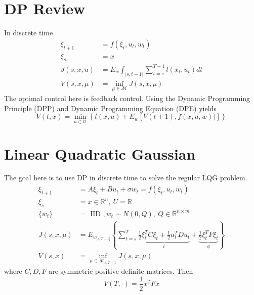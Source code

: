 
\mainmatter
\setcounter{page}{1}

\lectureseries[\course]{\course}

\date{October 13, 2009}

\setaddress

\setcounter{lecture}{4}
\setcounter{chapter}{4}


\section{DP Review}
In discrete time
\begin{align*}
\xi_{t+1} &= f(\xi_t,u_t,w_t) \\
\xi_s &= x \\
J(s,x,u) &= E_w\int_{]s,t-1[}\sum_{t=s}^{T-1}l(x_t,u_t)dt \\
V(s,x,\mu) &= \inf_{\mu\in\mathcal{M}}J(s,x,\mu)
\end{align*}
The optimal control here is feedback control. Using the Dynamic Programming Principle (DPP) and Dynamic Programming Equation (DPE) yields
$$V(t,x) = \min_{u\in\mathcal{U}}\left\lbrace l(x,u) + E_w[V(t+1),f(x,u,w))]\right\rbrace$$

\section{Linear Quadratic Gaussian}
The goal here is to use DP in discrete time to solve the regular LQG problem.
\begin{align*}
\xi_{t+1} &= A\xi_t + Bu_t + \sigma w_t = f(\xi_t,u_t,w_t) \\
\xi_s &= x \in \mathbb{R}^n, ~U=\mathbb{R} \\
\{w_t\} &= \text{ IID }, w_t\sim N(0,Q), ~Q\in\mathbb{R}^{n\times m} \\
J(s,x,\mu) &= E_{w_{]s,T-1[}} \left\lbrace \sum_{t=s}^T \underbrace{\frac{1}{2}\xi_t^T C \xi_t+\frac{1}{2}u_t^TDu_t}_{l} + \underbrace{\frac{1}{2}\xi_t^TF\xi_t}_{\phi} \right\rbrace \\
V(s,x) &= \inf_{\mu\in\mathcal{M}_{s,T-1}}J(s,x,\mu)
\end{align*}
where $C,D,F$ are symmetric positive definite matrices. Then
$$V(T,\cdot) = \frac{1}{2}x^TFx$$

